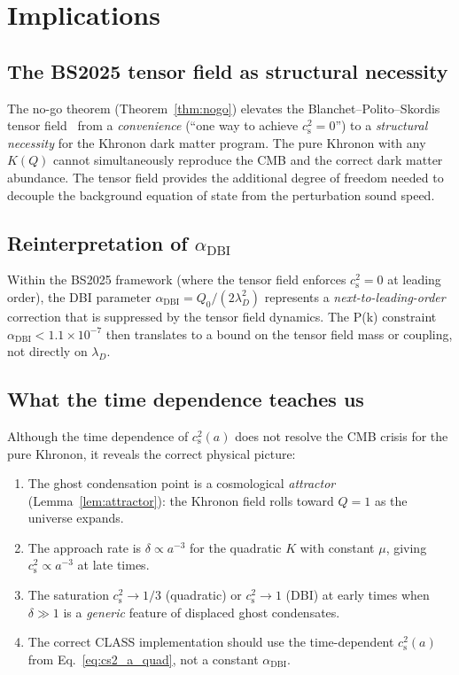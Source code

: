 \documentclass[prd,twocolumn,superscriptaddress,longbibliography,floatfix]{revtex4-2}
\newcommand{\cs}{c_{\mathrm{s}}}
\begin{document}
\section{Implications}
\label{sec:implications}

\subsection{The BS2025 tensor field as structural necessity}

The no-go theorem (Theorem~\ref{thm:nogo}) elevates the
Blanchet--Polito--Skordis tensor field~\cite{BS2025} from a
\emph{convenience} (``one way to achieve $\cs^2 = 0$'')
to a \emph{structural necessity} for the Khronon dark
matter program.  The pure Khronon with any $K(Q)$ cannot
simultaneously reproduce the CMB and the correct dark
matter abundance.  The tensor field provides the additional
degree of freedom needed to decouple the background
equation of state from the perturbation sound speed.

\subsection{Reinterpretation of $\alpha_{\mathrm{DBI}}$}

Within the BS2025 framework (where the tensor field
enforces $\cs^2 = 0$ at leading order), the DBI
parameter $\alpha_{\mathrm{DBI}} = Q_0/(2\lambda_D^2)$
represents a \emph{next-to-leading-order} correction
that is suppressed by the tensor field dynamics.  The
P(k) constraint $\alpha_{\mathrm{DBI}} < 1.1 \times 10^{-7}$
then translates to a bound on the tensor field mass
or coupling, not directly on $\lambda_D$.

\subsection{What the time dependence teaches us}

Although the time dependence of $\cs^2(a)$ does not
resolve the CMB crisis for the pure Khronon, it
reveals the correct physical picture:

\begin{enumerate}
\item The ghost condensation point is a cosmological
  \emph{attractor} (Lemma~\ref{lem:attractor}): the
  Khronon field rolls toward $Q = 1$ as the universe
  expands.

\item The approach rate is $\delta \propto a^{-3}$ for
  the quadratic $K$ with constant $\mu$, giving
  $\cs^2 \propto a^{-3}$ at late times.

\item The saturation $\cs^2 \to 1/3$ (quadratic) or
  $\cs^2 \to 1$ (DBI) at early times when
  $\delta \gg 1$ is a \emph{generic} feature of
  displaced ghost condensates.

\item The correct CLASS implementation should use
  the time-dependent $\cs^2(a)$ from
  Eq.~\eqref{eq:cs2_a_quad}, not a constant
  $\alpha_{\mathrm{DBI}}$.
\end{enumerate}
\end{document}
